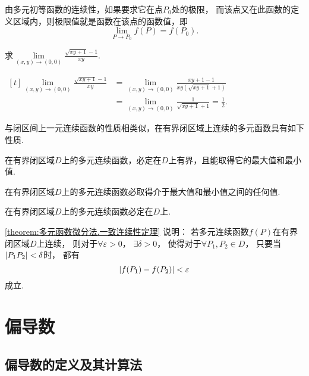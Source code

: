 由多元初等函数的连续性，如果要求它在点\(P_0\)处的极限，
而该点又在此函数的定义区域内，则极限值就是函数在该点的函数值，即\[
	\lim\limits_{P \to P_0} f(P) = f(P_0).
\]

\begin{example}
\def\l{\lim\limits_{(x,y)\to(0,0)}}
求\(\l \frac{\sqrt{xy+1}-1}{xy}\).
\begin{solution}
\(\begin{aligned}[t]
\l \frac{\sqrt{xy+1}-1}{xy}
&= \l \frac{xy+1-1}{xy(\sqrt{xy+1}+1)} \\
&= \l \frac{1}{\sqrt{xy+1}+1}
= \frac{1}{2}.
\end{aligned}\)
\end{solution}
\end{example}

与闭区间上一元连续函数的性质相类似，在有界闭区域上连续的多元函数具有如下性质.

\begin{property}[有界性与最值定理]\label{theorem:多元函数微分法.有界性与最值定理}
在有界闭区域\(D\)上的多元连续函数，必定在\(D\)上有界，且能取得它的最大值和最小值.
\end{property}

\begin{property}[介值定理]\label{theorem:多元函数微分法.介值定理}
在有界闭区域\(D\)上的多元连续函数必取得介于最大值和最小值之间的任何值.
\end{property}

\begin{property}[一致连续性定理]\label{theorem:多元函数微分法.一致连续性定理}
在有界闭区域\(D\)上的多元连续函数必定在\(D\)上.
\end{property}
\cref{theorem:多元函数微分法.一致连续性定理} 说明：
若多元连续函数\(f(P)\)在有界闭区域\(D\)上连续，
则对于\(\forall \varepsilon > 0\)，
\(\exists \delta > 0\)，
使得对于\(\forall P_1,P_2 \in D\)，
只要当\(\abs{P_1P_2}<\delta\)时，
都有\[
	\abs{f(P_1)-f(P_2)} < \varepsilon
\]成立.

\section{偏导数}
\subsection{偏导数的定义及其计算法}
